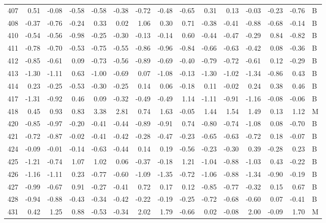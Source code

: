 \begin{table}[ht]
\begin{tabular}{rrrrrrrrrrrrrrl}
  407 & 0.51 & -0.08 & -0.58 & -0.58 & -0.38 & -0.72 & -0.48 & -0.65 & 0.31 & 0.13 & -0.03 & -0.23 & -0.76 & B \\ 
  408 & -0.37 & -0.76 & -0.24 & 0.33 & 0.02 & 1.06 & 0.30 & 0.71 & -0.38 & -0.41 & -0.88 & -0.68 & -0.14 & B \\ 
  410 & -0.54 & -0.56 & -0.98 & -0.25 & -0.30 & -0.13 & -0.14 & 0.60 & -0.44 & -0.47 & -0.29 & 0.84 & -0.82 & B \\ 
  411 & -0.78 & -0.70 & -0.53 & -0.75 & -0.55 & -0.86 & -0.96 & -0.84 & -0.66 & -0.63 & -0.42 & 0.08 & -0.36 & B \\ 
  412 & -0.85 & -0.61 & 0.09 & -0.73 & -0.56 & -0.89 & -0.69 & -0.40 & -0.79 & -0.72 & -0.61 & 0.12 & -0.29 & B \\ 
  413 & -1.30 & -1.11 & 0.63 & -1.00 & -0.69 & 0.07 & -1.08 & -0.13 & -1.30 & -1.02 & -1.34 & -0.86 & 0.43 & B \\ 
  414 & 0.23 & -0.25 & -0.53 & -0.30 & -0.25 & 0.14 & 0.06 & -0.18 & 0.11 & -0.02 & 0.24 & 0.38 & 0.46 & B \\ 
  417 & -1.31 & -0.92 & 0.46 & 0.09 & -0.32 & -0.49 & -0.49 & 1.14 & -1.11 & -0.91 & -1.16 & -0.08 & -0.06 & B \\ 
  418 & 0.45 & 0.93 & 0.83 & 3.38 & 2.81 & 0.74 & 1.63 & -0.05 & 1.44 & 1.54 & 1.49 & 0.13 & 1.12 & M \\ 
  420 & -0.85 & -0.97 & -0.20 & -0.41 & -0.44 & -0.89 & -0.91 & 0.74 & -0.80 & -0.74 & -1.08 & 0.08 & -0.70 & B \\ 
  421 & -0.72 & -0.87 & -0.02 & -0.41 & -0.42 & -0.28 & -0.47 & -0.23 & -0.65 & -0.63 & -0.72 & 0.18 & -0.07 & B \\ 
  424 & -0.09 & -0.01 & -0.14 & -0.63 & -0.44 & 0.14 & 0.19 & -0.56 & -0.23 & -0.30 & 0.39 & -0.28 & 0.23 & B \\ 
  425 & -1.21 & -0.74 & 1.07 & 1.02 & 0.06 & -0.37 & -0.18 & 1.21 & -1.04 & -0.88 & -1.03 & 0.43 & -0.22 & B \\ 
  426 & -1.16 & -1.11 & 0.23 & -0.77 & -0.60 & -1.09 & -1.35 & -0.72 & -1.06 & -0.88 & -1.34 & -0.90 & -0.19 & B \\ 
  427 & -0.99 & -0.67 & 0.91 & -0.27 & -0.41 & 0.72 & 0.17 & 0.12 & -0.85 & -0.77 & -0.32 & 0.15 & 0.67 & B \\ 
  428 & -0.94 & -0.88 & -0.43 & -0.34 & -0.42 & -0.22 & -0.19 & -0.25 & -0.72 & -0.68 & -0.60 & 0.07 & -0.41 & B \\ 
  431 & 0.42 & 1.25 & 0.88 & -0.53 & -0.34 & 2.02 & 1.79 & -0.66 & 0.02 & -0.08 & 2.00 & -0.09 & 1.70 & M \\ 

\end{tabular}
\end{table}
